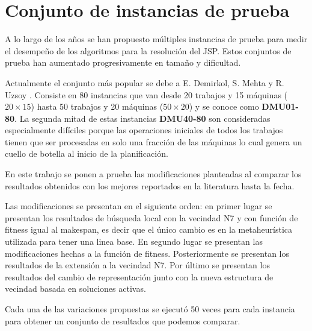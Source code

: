 \section{Conjunto de instancias de prueba}
A lo largo de los años se han propuesto múltiples instancias de prueba para medir el desempeño de los algoritmos para la resolución del JSP. Estos conjuntos de prueba han aumentado progresivamente en tamaño y dificultad. 

Actualmente el conjunto más popular se debe a E. Demirkol, S. Mehta y R. Uzsoy \cite{demirkol1997computational}. Consiste en 80 instancias que van desde 20 trabajos y 15 máquinas ($20\times 15$) hasta 50 trabajos y 20 máquinas ($50\times 20$) y se conoce como \textbf{DMU01-80}. La segunda mitad de estas instancias \textbf{DMU40-80} son consideradas especialmente difíciles porque las operaciones iniciales de todos los trabajos tienen que ser procesadas en solo una fracción de las máquinas lo cual genera un cuello de botella al inicio de la planificación.

En este trabajo se ponen a prueba las modificaciones planteadas al comparar los resultados obtenidos con los mejores reportados en la literatura hasta la fecha.

Las modificaciones se presentan en el siguiente orden: en primer lugar se presentan los resultados de búsqueda local con la vecindad N7 y con función de fitness igual al makespan, es decir que el único cambio es en la metaheurística utilizada para tener una linea base. En segundo lugar se presentan las modificaciones hechas a la función de fitness. Posteriormente se presentan los resultados de la extensión a la vecindad N7. Por último se presentan los resultados del cambio de representación junto con la nueva estructura de vecindad basada en soluciones activas.

Cada una de las variaciones propuestas se ejecutó 50 veces para cada instancia para obtener un conjunto de resultados que podemos comparar.


